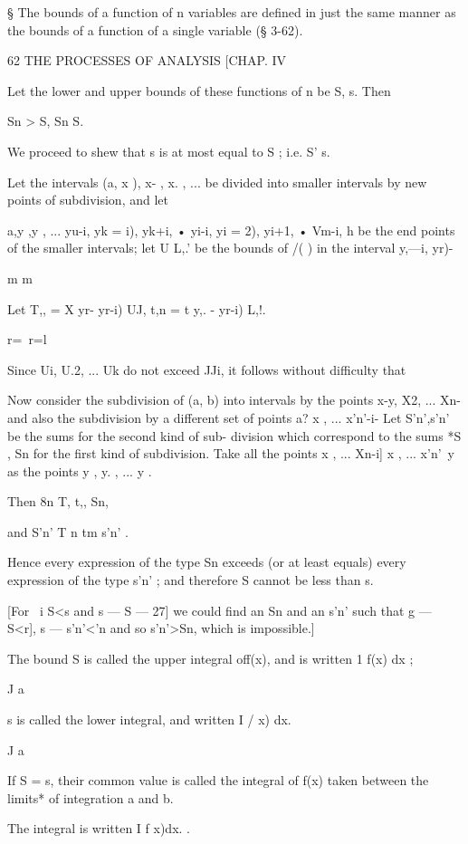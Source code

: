 § The bounds of a function of n variables are defined in just the same
manner as the bounds of a function of a single variable (§ 3-62).



62 THE PROCESSES OF ANALYSIS [CHAP. IV

Let the lower and upper bounds of these functions of n be S, s. Then

Sn > S, Sn S.

We proceed to shew that s is at most equal to S ; i.e. S' s.

Let the intervals (a, x ), x- , x. , ... be divided into smaller
intervals by new points of subdivision, and let

a,y ,y , ... yu-i, yk = i), yk+i, • yi-i, yi = 2), yi+1, • Vm-i, h be
the end points of the smaller intervals; let U L,.' be the bounds of
/( ) in the interval y,—i, yr)-

m m

Let T,, = X yr- yr-i) UJ, t,n = t y,. - yr-i) L,!.

r=\ r=l

Since Ui, U.2, ... Uk do not exceed JJi, it follows without difficulty
that

Now consider the subdivision of (a, b) into intervals by the points
x-y, X2, ... Xn-\, and also the subdivision by a different set of
points a? x , ... x'n'-i- Let S'n',s'n' be the sums for the second
kind of sub- division which correspond to the sums *S , Sn for the
first kind of subdivision. Take all the points x , ... Xn-i] x , ...
x'n'\ y as the points y , y. , ... y .

Then 8n T, t,, Sn,

and S'n' T n tm s'n' .

Hence every expression of the type Sn exceeds (or at least equals)
every expression of the type s'n' ; and therefore S cannot be less
than s.

[For \ i S<s and s — S — 27] we could find an Sn and an s'n' such that
g — S<r], s — s'n'<'n and so s'n'>Sn, which is impossible.]

The bound S is called the upper integral off(x), and is written 1 f(x)
dx ;

J a

s is called the lower integral, and written I / x) dx.

J a

If S = s, their common value is called the integral of f(x) taken
between the limits* of integration a and b.

The integral is written I f x)dx. .

